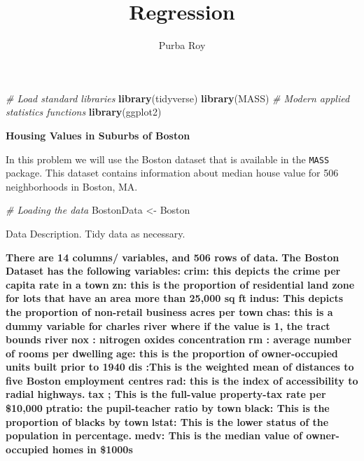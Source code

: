 \documentclass[]{article}
\title{Regression}
\author{Purba Roy}
\date{}
\newenvironment{Shaded}{\begin{snugshade}}{\end{snugshade}}
\newcommand{\CommentTok}[1]{\textcolor[rgb]{0.56,0.35,0.01}{\textit{#1}}}
\newcommand{\KeywordTok}[1]{\textcolor[rgb]{0.13,0.29,0.53}{\textbf{#1}}}
\newcommand{\NormalTok}[1]{#1}
\newcommand{\StringTok}[1]{\textcolor[rgb]{0.31,0.60,0.02}{#1}}
\begin{document}
\maketitle

\begin{Shaded}
\begin{Highlighting}[]
\CommentTok{# Load standard libraries}
\KeywordTok{library}\NormalTok{(tidyverse)}
\KeywordTok{library}\NormalTok{(MASS) }\CommentTok{# Modern applied statistics functions}
\KeywordTok{library}\NormalTok{(ggplot2)}
\end{Highlighting}
\end{Shaded}

\textbf{Housing Values in Suburbs of Boston}

In this problem we will use the Boston dataset that is available in the
\texttt{MASS} package. This dataset contains information about median
house value for 506 neighborhoods in Boston, MA.

\begin{Shaded}
\begin{Highlighting}[]
\CommentTok{# Loading the data}
\NormalTok{BostonData <-}\StringTok{ }\NormalTok{Boston}
\end{Highlighting}
\end{Shaded}

\benum

\item

Data Description. Tidy data as necessary.

\textbf{There are 14 columns/ variables, and 506 rows of data.}
\textbf{The Boston Dataset has the following variables:} \textbf{crim:
this depicts the crime per capita rate in a town} \textbf{zn: this is
the proportion of residential land zone for lots that have an area more
than 25,000 sq ft} \textbf{indus: This depicts the proportion of
non-retail business acres per town} \textbf{chas: this is a dummy
variable for charles river where if the value is 1, the tract bounds
river} \textbf{nox : nitrogen oxides concentration} \textbf{rm : average
number of rooms per dwelling} \textbf{age: this is the proportion of
owner-occupied units built prior to 1940} \textbf{dis :This is the
weighted mean of distances to five Boston employment centres}
\textbf{rad: this is the index of accessibility to radial highways.}
\textbf{tax ; This is the full-value property-tax rate per \$10,000}
\textbf{ptratio: the pupil-teacher ratio by town } \textbf{black: This
is the proportion of blacks by town} \textbf{lstat: This is the lower
status of the population in percentage.} \textbf{medv: This is the
median value of owner-occupied homes in \$1000s}
\end{document}
